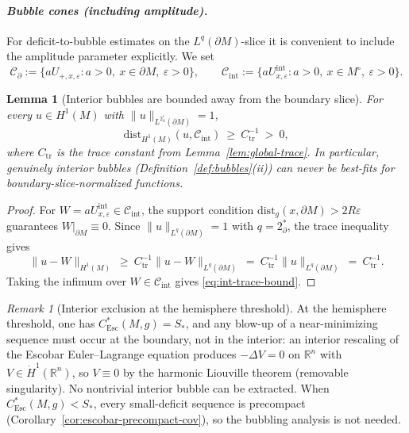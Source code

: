 \documentclass[11pt,reqno,a4paper]{amsart}
\newcommand{\R}{\mathbb{R}}
\numberwithin{equation}{section}
\newcommand{\dist}{\mathrm{dist}}
\theoremstyle{plain}
\newtheorem{lemma}[theorem]{Lemma}
\newcommand{\Esc}{\ensuremath{\mathrm{Esc}}}
\theoremstyle{remark}
\newtheorem{remark}[theorem]{Remark}
\theoremstyle{plain}
\begin{document}
\paragraph{\emph{Bubble cones (including amplitude).}}
For deficit-to-bubble estimates on the $L^q(\partial M)$-slice it is convenient to include the
amplitude parameter explicitly.  We set
\[
\mathcal C_{\partial}:=\{aU_{+,x,\varepsilon}: a>0,\ x\in\partial M,\ \varepsilon>0\},
\qquad
\mathcal C_{\mathrm{int}}:=\{aU^{\mathrm{int}}_{x,\varepsilon}: a>0,\ x\in M^\circ,\ \varepsilon>0\}.
\]

\begin{lemma}[Interior bubbles are bounded away from the boundary slice]\label{lem:no-interior-channel}
For every $u\in H^1(M)$ with $\|u\|_{L^{2^*_{\partial}}(\partial M)}=1$,
\begin{equation}\label{eq:int-trace-bound}
\dist_{H^1(M)}(u,\mathcal C_{\mathrm{int}})\ \ge\ C_{\mathrm{tr}}^{-1}\ >\ 0,
\end{equation}
where $C_{\mathrm{tr}}$ is the trace constant from Lemma~\ref{lem:global-trace}.
In particular, genuinely interior bubbles (Definition~\ref{def:bubbles}(ii)) can never be best-fits for boundary-slice-normalized functions.
\end{lemma}

\begin{proof}
For $W=aU^{\mathrm{int}}_{x,\varepsilon}\in\mathcal C_{\mathrm{int}}$,
the support condition
$\dist_g(x,\partial M)>2R\varepsilon$ guarantees
$W|_{\partial M}\equiv0$.
Since $\|u\|_{L^q(\partial M)}=1$ with $q=2^*_\partial$, the trace
inequality gives
\[
\|u-W\|_{H^1(M)}\ \ge\ C_{\mathrm{tr}}^{-1}\|u-W\|_{L^q(\partial M)}
\ =\ C_{\mathrm{tr}}^{-1}\|u\|_{L^q(\partial M)}
\ =\ C_{\mathrm{tr}}^{-1}.
\]
Taking the infimum over $W\in\mathcal C_{\mathrm{int}}$ gives \eqref{eq:int-trace-bound}.
\end{proof}

\begin{remark}[Interior exclusion at the hemisphere threshold]\label{rem:interior-exclusion-threshold}
At the hemisphere threshold, one has $C^*_{\Esc}(M,g)=S_\ast$, and any blow-up
of a near-minimizing sequence must occur at the boundary, not in the interior:
an interior rescaling of the Escobar Euler--Lagrange equation produces
$-\Delta V=0$ on $\R^n$ with $V\in\dot H^1(\R^n)$, so $V\equiv0$ by the
harmonic Liouville theorem (removable singularity). No nontrivial interior
bubble can be extracted.
When $C^*_{\Esc}(M,g)<S_\ast$, every small-deficit sequence is
precompact (Corollary~\ref{cor:escobar-precompact-cov}),
so the bubbling analysis is not needed.
\end{remark}
\end{document}

